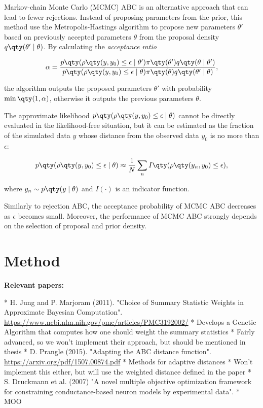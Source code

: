 Markov-chain Monte Carlo (MCMC) ABC is an alternative approach that can lead to fewer rejections. Instead of proposing parameters from the prior, this method use the Metropolis-Hastings algorithm to propose new parameters $\theta'$ based on previously accepted parameters $\theta$ from the proposal density $q \qty(\theta' \mid \theta)$. By calculating the \textit{acceptance ratio}

\begin{equation}
    \alpha = \frac{p \qty(\rho \qty(y, y_0 ) \leq \epsilon \mid \theta') \pi\qty(\theta') q \qty(\theta \mid \theta')  }{p \qty(\rho \qty(y, y_0) \leq \epsilon \mid \theta) \pi\qty(\theta) q \qty(\theta' \mid \theta) },
\end{equation}

the algorithm outputs the proposed parameters $\theta'$ with probability $\min \qty(1, \alpha)$, otherwise it outputs the previous parameters $\theta$. 

The approximate likelihood $p \qty(\rho \qty(y, y_0 ) \leq \epsilon \mid \theta)$ cannot be directly evaluated in the likelihood-free situation, but it can be estimated as the fraction of the simulated data $y$ whose distance from the observed data $y_0$ is no more than $\epsilon$:

\begin{equation}
    p \qty(\rho \qty(y, y_0) \leq \epsilon \mid \theta) \approx \frac{1}{N} \sum_n I \qty(\rho \qty(y_n, y_0) \leq \epsilon),
\end{equation}

where $y_n \sim p \qty(y \mid \theta)$ and $I(\cdot)$ is an indicator function. %

Similarly to rejection ABC, the acceptance probability of MCMC ABC decreases as $\epsilon$ becomes small. Moreover, the performance of MCMC ABC strongly depends on the selection of proposal and prior density.


\section{Method}

\textbf{Relevant papers:}

* H. Jung and P. Marjoram (2011). "Choice of Summary Statistic Weights in Approximate Bayesian Computation". \url{https://www.ncbi.nlm.nih.gov/pmc/articles/PMC3192002/}
    * Develops a Genetic Algorithm that computes how one should weight the summary statistics 
    * Fairly advanced, so we won't implement their approach, but should be mentioned in thesis
* D. Prangle (2015). "Adapting the ABC distance function". \url{https://arxiv.org/pdf/1507.00874.pdf}
    * Methods for adaptive distances
    * Won't implement this either, but will use the weighted distance defined in the paper
* S. Druckmann et al. (2007) "A novel multiple objective optimization framework for constraining conductance-based neuron models by experimental data". 
    * MOO
    
